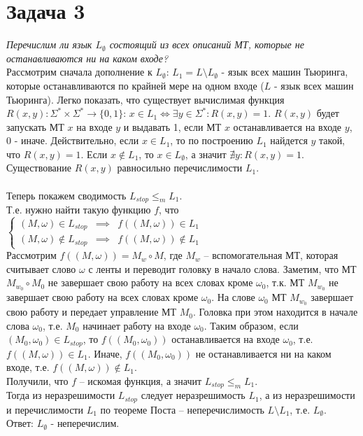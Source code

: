 \documentclass{article}
\begin{document}
\section*{Задача 3}

\textit{Перечислим ли язык $L_\emptyset$ состоящий из всех описаний МТ, которые не останавливаются ни на каком входе?}\\

Рассмотрим сначала дополнение к $L_\emptyset$: $L_1 = L \setminus L_\emptyset$ - язык всех машин Тьюринга, которые останавливаются по крайней мере на одном входе ($L$ - язык всех машин Тьюринга). Легко показать, что существует вычислимая функция $R(x, y): \Sigma^*\times\Sigma^* \rightarrow \{0, 1\}$: $x\in L_1 \iff \exists y \in \Sigma^*: R(x, y) = 1$. $R(x, y)$ будет запускать МТ $x$ на входе $y$ и выдавать 1, если МТ $x$ останавливается на входе $y$, 0 - иначе. Действительно, если $x \in L_1$, то по построению $L_1$ найдется $y$ такой, что $R(x, y) = 1$. Если $x \notin L_1$, то $x \in L_\emptyset$, а значит  $\nexists y: R(x, y) = 1$. Существование $R(x, y)$ равносильно перечислимости $L_1$.\\\\
Теперь покажем сводимость $L_{stop} \leqslant_m L_1$.\\
Т.е. нужно найти такую функцию $f$, что $\left \{\begin{array}{ccc} (M, \omega) \in L_{stop} & \implies & f((M, \omega)) \in L_1 \\ (M, \omega) \not \in L_{stop} & \implies & f((M, \omega)) \not \in L_1 \end{array}\right.$\\
Рассмотрим $f((M, \omega)) = M_w\circ M$, где $M_w$ -- вспомогательная МТ, которая считывает слово $\omega$ с ленты и переводит головку в начало слова. Заметим, что МТ $ M_{w_0}\circ M_0$ не завершает свою работу на всех словах кроме $\omega_0$, т.к. МТ $M_{w_0}$ не завершает свою работу на всех словах кроме $\omega_0$. На слове $\omega_0$ МТ $M_{w_0}$ завершает свою работу и передает управление МТ $M_0$. Головка при этом находится в начале слова $\omega_0$, т.е. $M_0$ начинает работу на входе $\omega_0$. Таким образом, если $(M_0, \omega_0) \in L_{stop}$, то $f((M_0, \omega_0))$ останавливается на входе $\omega_0$, т.е. $f((M, \omega)) \in L_1$. Иначе, $f((M_0, \omega_0))$ не останавливается ни на каком входе, т.е. $f((M, \omega)) \notin L_1$.\\
Получили, что $f$ -- искомая функция, а значит $L_{stop} \leqslant_m L_1$.\\
Тогда из неразрешимости $L_{stop}$ следует неразрешимость $L_1$, а из неразрешимости и перечислимости $L_1$ по теореме Поста -- неперечислимость $L \setminus L_1$, т.е. $L_\emptyset$.\\
Ответ: $L_\emptyset$ - неперечислим.
\end{document}
